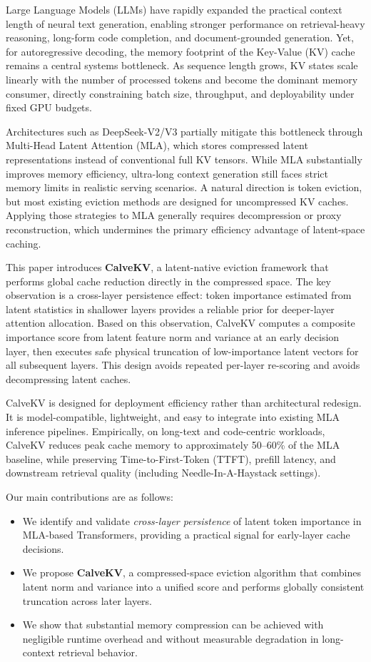 \documentclass[letterpaper]{article} %
\begin{document}
Large Language Models (LLMs) have rapidly expanded the practical context length of neural text generation, enabling stronger performance on retrieval-heavy reasoning, long-form code completion, and document-grounded generation. Yet, for autoregressive decoding, the memory footprint of the Key-Value (KV) cache remains a central systems bottleneck. As sequence length grows, KV states scale linearly with the number of processed tokens and become the dominant memory consumer, directly constraining batch size, throughput, and deployability under fixed GPU budgets.

Architectures such as DeepSeek-V2/V3 partially mitigate this bottleneck through Multi-Head Latent Attention (MLA), which stores compressed latent representations instead of conventional full KV tensors. While MLA substantially improves memory efficiency, ultra-long context generation still faces strict memory limits in realistic serving scenarios. A natural direction is token eviction, but most existing eviction methods are designed for uncompressed KV caches. Applying those strategies to MLA generally requires decompression or proxy reconstruction, which undermines the primary efficiency advantage of latent-space caching.

This paper introduces \textbf{CalveKV}, a latent-native eviction framework that performs global cache reduction directly in the compressed space. The key observation is a cross-layer persistence effect: token importance estimated from latent statistics in shallower layers provides a reliable prior for deeper-layer attention allocation. Based on this observation, CalveKV computes a composite importance score from latent feature norm and variance at an early decision layer, then executes safe physical truncation of low-importance latent vectors for all subsequent layers. This design avoids repeated per-layer re-scoring and avoids decompressing latent caches.

CalveKV is designed for deployment efficiency rather than architectural redesign. It is model-compatible, lightweight, and easy to integrate into existing MLA inference pipelines. Empirically, on long-text and code-centric workloads, CalveKV reduces peak cache memory to approximately 50--60\% of the MLA baseline, while preserving Time-to-First-Token (TTFT), prefill latency, and downstream retrieval quality (including Needle-In-A-Haystack settings).

Our main contributions are as follows:
\begin{itemize}
  \item We identify and validate \emph{cross-layer persistence} of latent token importance in MLA-based Transformers, providing a practical signal for early-layer cache decisions.
  \item We propose \textbf{CalveKV}, a compressed-space eviction algorithm that combines latent norm and variance into a unified score and performs globally consistent truncation across later layers.
  \item We show that substantial memory compression can be achieved with negligible runtime overhead and without measurable degradation in long-context retrieval behavior.
\end{itemize}
\end{document}
